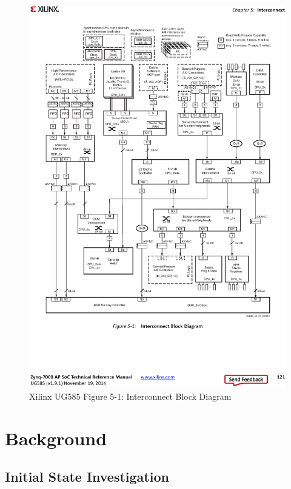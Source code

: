 \documentclass[a4paper]{article}
\begin{document}
\begin{figure}[p]
  \includegraphics[width=1.4\textwidth,center]{fig/interconnect-block.eps}
  \caption{Xilinx UG585\cite{ug585} Figure 5-1: Interconnect Block Diagram}
  \label{fig:inter-block}
\end{figure}

\section{Background}
  \subsection{Initial State Investigation}
\end{document}
